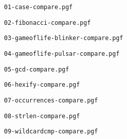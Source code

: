 \documentclass{article}
\newcommand{\plot}[1]{\texttt{#1}

\fbox{\resizebox{\textwidth}{!}{}}
}
\begin{document}
\plot{01-case-compare.pgf}

\plot{02-fibonacci-compare.pgf}

\newpage
\plot{03-gameoflife-blinker-compare.pgf}

\plot{04-gameoflife-pulsar-compare.pgf}

\newpage
\plot{05-gcd-compare.pgf}

\plot{06-hexify-compare.pgf}

\newpage
\plot{07-occurrences-compare.pgf}

\plot{08-strlen-compare.pgf}

\newpage
\plot{09-wildcardcmp-compare.pgf}
\end{document}
